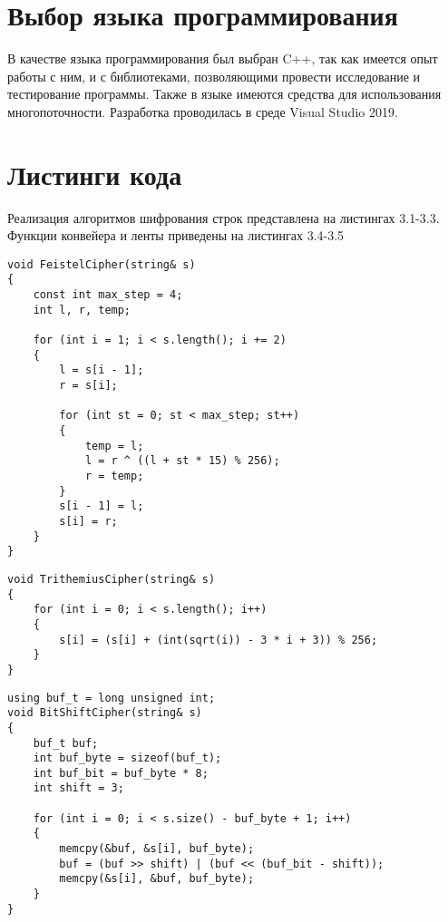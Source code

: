 \section{Выбор языка программирования}
В качестве языка программирования был выбран C++\cite{C++_Doc}, так как имеется опыт работы с ним, и с библиотеками, позволяющими провести исследование и тестирование программы. Также в языке имеются средства для использования многопоточности\cite{Thread}. Разработка проводилась в среде Visual Studio 2019\cite{VisualStudio}.

\section{Листинги кода}
Реализация алгоритмов шифрования строк представлена на листингах 3.1-3.3. Функции конвейера и ленты приведены на листингах 3.4-3.5

\begin{lstlisting}[caption = {Функция шифра Фейстеля}]
void FeistelCipher(string& s)
{
	const int max_step = 4;
	int l, r, temp;
	
	for (int i = 1; i < s.length(); i += 2)
	{
		l = s[i - 1];
		r = s[i];
		
		for (int st = 0; st < max_step; st++)
		{
			temp = l;
			l = r ^ ((l + st * 15) % 256);
			r = temp;
		}
		s[i - 1] = l;
		s[i] = r;
	}
}
\end{lstlisting}

\begin{lstlisting}[caption = {Функция шифра Тритемиуса}]
void TrithemiusCipher(string& s)
{
	for (int i = 0; i < s.length(); i++)
	{
		s[i] = (s[i] + (int(sqrt(i)) - 3 * i + 3)) % 256;
	}
}
\end{lstlisting}

\begin{lstlisting}[caption = {Функция шифра побитовыми сдвигами}]
using buf_t = long unsigned int;
void BitShiftCipher(string& s)
{
	buf_t buf;
	int buf_byte = sizeof(buf_t);
	int buf_bit = buf_byte * 8;
	int shift = 3;
	
	for (int i = 0; i < s.size() - buf_byte + 1; i++)
	{
		memcpy(&buf, &s[i], buf_byte);
		buf = (buf >> shift) | (buf << (buf_bit - shift));
		memcpy(&s[i], &buf, buf_byte);
	}
}
\end{lstlisting}

